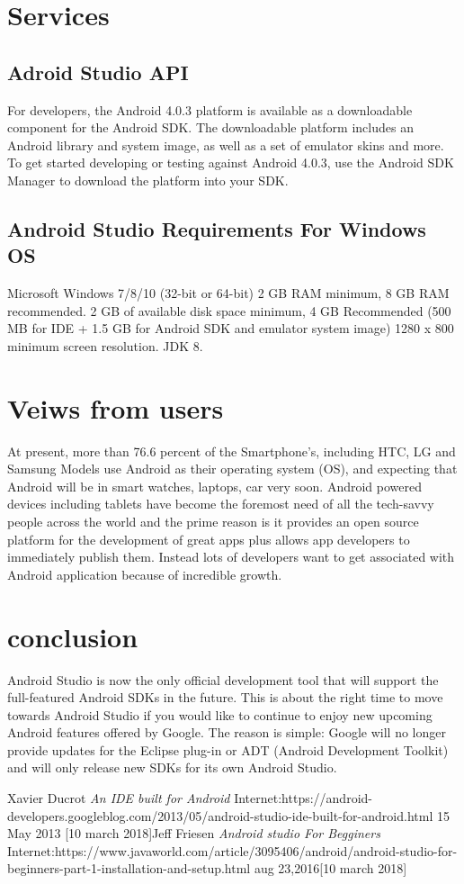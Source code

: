 \documentclass[7pt]{article}
\begin{document}
\section{Services }
\subsection{Adroid Studio API}
 For developers, the Android 4.0.3 platform is available as a downloadable component for the Android SDK. The downloadable platform includes an Android library and system image, as well as a set of emulator skins and more. To get started developing or testing against Android 4.0.3, use the Android SDK Manager to download the platform into your SDK.

\subsection{Android Studio Requirements For Windows OS}
Microsoft Windows 7/8/10 (32-bit or 64-bit)
2 GB RAM minimum, 8 GB RAM recommended.
2 GB of available disk space minimum, 4 GB Recommended (500 MB for IDE + 1.5 GB for Android SDK and emulator system image)
1280 x 800 minimum screen resolution.
JDK 8\cite{r2}.
\section{Veiws from users}
At present, more than 76.6 percent of the Smartphone’s, including HTC, LG and Samsung Models use Android as their operating system (OS), and expecting that Android will be in smart watches, laptops, car very soon. Android powered devices including tablets have become the foremost need of all the tech-savvy people across the world and the prime reason is it provides an open source platform for the development of great apps plus allows app developers to immediately publish them. Instead lots of developers want to get associated with Android application because of incredible growth.
\section{conclusion}

Android Studio is now the only official development tool that will support the full-featured Android SDKs in the future. This is about the right time to move towards Android Studio if you would like to continue to enjoy new upcoming Android features offered by Google. The reason is simple: Google will no longer provide updates for the Eclipse plug-in or ADT (Android Development Toolkit) and will only release new SDKs for its own Android Studio.

\begin{thebibliography}{9}
Xavier Ducrot \textit{An IDE built for Android}
Internet:https://android-developers.googleblog.com/2013/05/android-studio-ide-built-for-android.html  15 May 2013 [10 march 2018]Jeff Friesen \textit{Android studio For Begginers}
Internet:https://www.javaworld.com/article/3095406/android/android-studio-for-beginners-part-1-installation-and-setup.html  aug 23,2016[10 march 2018]
\end{thebibliography}
\end{document}
